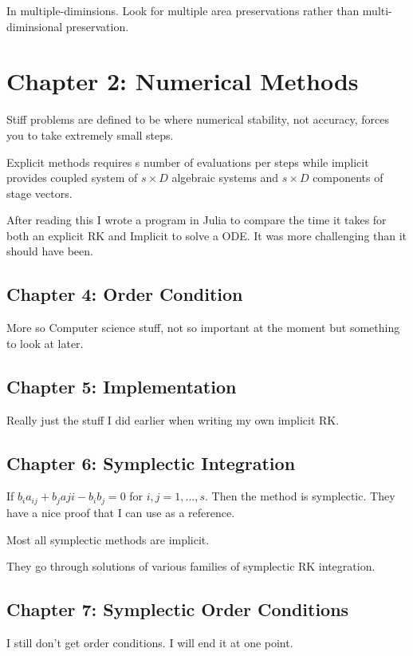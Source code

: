 In multiple-diminsions. Look for multiple area preservations rather than multi-diminsional preservation.

\section{Chapter 2: Numerical Methods}

Stiff problems are defined to be where numerical stability, not accuracy, forces you to take extremely small steps.

Explicit methods requires s number of evaluations per steps while implicit provides coupled system of $s \times D $ algebraic systems and $s \times D $ components of stage vectors.

After reading this I wrote a program in Julia to compare the time it takes for both an explicit RK and Implicit to solve a ODE. It was more challenging than it should have been.

\subsection{Chapter 4: Order Condition}

More so Computer science stuff, not so important at the moment but something to look at later.

\subsection{Chapter 5: Implementation}
Really just the stuff I did earlier when writing my own implicit RK.

\subsection{Chapter 6: Symplectic Integration}

If $ b_i a_{ij} + b_j a{ji} - b_i b_j = 0 $ for $i,j = 1,...,s$. Then the method is symplectic. They have a nice proof that I can use as a reference.

Most all symplectic methods are implicit.

They go through solutions of various families of symplectic RK integration.

\subsection{Chapter 7: Symplectic Order Conditions}

I still don't get order conditions. I will end it at one point.


